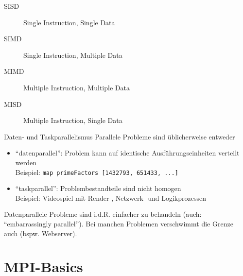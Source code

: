 \documentclass{beamer}
\begin{document}
\begin{frame}{SISD}
	\begin{figure}
		
		\caption*{Single Instruction, Single Data}
	\end{figure}
\end{frame}

\begin{frame}{SIMD}
	\begin{figure}
		
		\caption*{Single Instruction, Multiple Data}
	\end{figure}
\end{frame}

\begin{frame}{MIMD}
	\begin{figure}
		
		\caption*{Multiple Instruction, Multiple Data}
	\end{figure}
\end{frame}

\begin{frame}{MISD}
	\begin{figure}
		
		\caption*{Multiple Instruction, Single Data}
	\end{figure}
\end{frame}

\begin{frame}{Daten- und Taskparallelismus}
	Parallele Probleme sind üblicherweise entweder
	
	\begin{itemize}
		\item \enquote{datenparallel}: Problem kann auf identische Ausführungseinheiten verteilt werden\\
			Beispiel: \texttt{map primeFactors [1432793, 651433, ...]}

		\item \enquote{taskparallel}: Problembestandteile sind nicht homogen\\
			Beispiel: Videospiel mit Render-, Netzwerk- und Logikprozessen
	\end{itemize}

	Datenparallele Probleme sind i.d.R. einfacher zu behandeln (auch: \enquote{embarrassingly parallel}).
	Bei manchen Problemen verschwimmt die Grenze auch (bspw. Webserver).
\end{frame}

\section{MPI-Basics}
\end{document}
